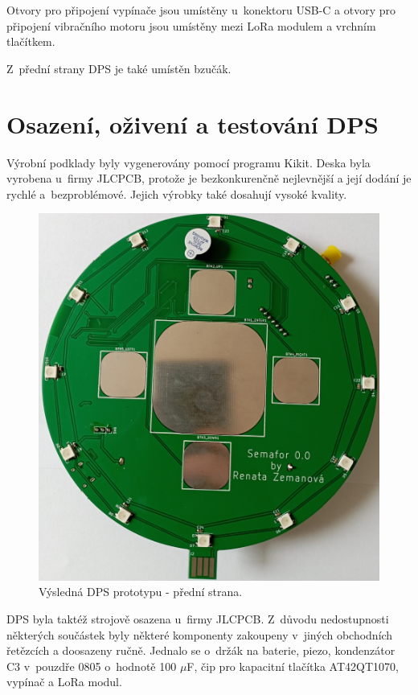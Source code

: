 Otvory pro připojení vypínače jsou umístěny u~konektoru USB-C a otvory pro připojení vibračního motoru jsou umístěny mezi LoRa modulem a vrchním tlačítkem. 

Z~přední strany DPS je také umístěn bzučák. 

\chapter{Osazení, oživení a testování DPS}
Výrobní podklady byly vygenerovány pomocí programu Kikit. Deska byla vyrobena u~firmy JLCPCB, protože je bezkonkurenčně nejlevnější a její dodání je rychlé a~bezproblémové. 
Jejich výrobky také dosahují vysoké kvality. 

\begin{figure}[!h]
  \begin{center}
    \includegraphics[scale=0.15]{obrazky/DPS_prototyp_top.jpg}
  \end{center}
  \caption[Výsledná DPS prototypu - přední strana]{Výsledná DPS prototypu - přední strana.}
\end{figure}

DPS byla taktéž strojově osazena u~firmy JLCPCB. Z~důvodu nedostupnosti některých součástek byly některé komponenty zakoupeny v~jiných obchodních řetězcích a doosazeny ručně. 
Jednalo se o~držák na baterie, piezo, kondenzátor C3 v~pouzdře 0805 o~hodnotě 100 $\mu$F, čip pro kapacitní tlačítka AT42QT1070, vypínač a LoRa modul. 

